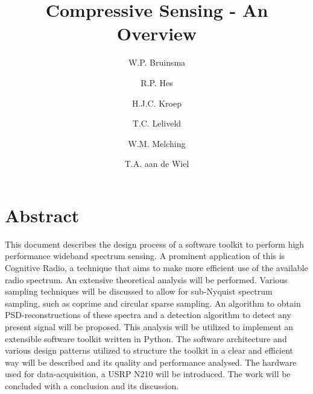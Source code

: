 \documentclass[a4paper, openany, oneside]{memoir}
\title{Compressive Sensing - An Overview}
\author{W.P. Bruinsma \and R.P. Hes \and H.J.C. Kroep \and T.C. Leliveld \and W.M. Melching \and T.A. aan de Wiel}
\begin{document}
\section*{Abstract}
This document describes the design process of a software toolkit to perform high performance wideband spectrum sensing. A prominent application of this is Cognitive Radio, a technique that aims to make more efficient use of the available radio spectrum. An extensive theoretical analysis will be performed. Various sampling techniques will be discussed to allow for sub-Nyquist spectrum sampling, such as coprime and circular sparse sampling. An algorithm to obtain PSD-reconstructions of these spectra and a detection algorithm to detect any present signal will be proposed. This analysis will be utilized to implement an extensible software toolkit written in Python. The software architecture and various design patterns utilized to structure the toolkit in a clear and efficient way will be described and its quality and performance analysed. The hardware used for data-acquisition, a USRP N210 will be introduced. The work will be concluded with a conclusion and its discussion.
\end{document}
